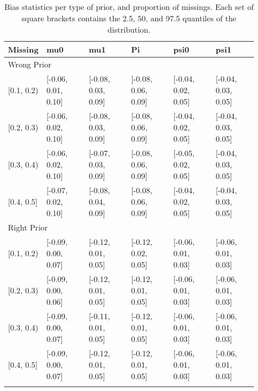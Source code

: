 \begin{table}[ht]
\centering
\begin{tabular}{llllll}
  \toprule
Missing & mu0 & mu1 & Pi & psi0 & psi1 \\ 
  \midrule
\multicolumn{6}{l}{Wrong Prior}\\
{[0.1, 0.2)} & {[-0.06, 0.01, 0.10]} & {[-0.08, 0.03, 0.09]} & {[-0.08, 0.06, 0.09]} & {[-0.04, 0.02, 0.05]} & {[-0.04, 0.03, 0.05]} \\ 
  {[0.2, 0.3)} & {[-0.06, 0.02, 0.10]} & {[-0.08, 0.03, 0.09]} & {[-0.08, 0.06, 0.09]} & {[-0.04, 0.02, 0.05]} & {[-0.04, 0.03, 0.05]} \\ 
  {[0.3, 0.4)} & {[-0.06, 0.02, 0.10]} & {[-0.07, 0.03, 0.09]} & {[-0.08, 0.06, 0.09]} & {[-0.05, 0.02, 0.05]} & {[-0.04, 0.03, 0.05]} \\ 
  {[0.4, 0.5]} & {[-0.07, 0.02, 0.10]} & {[-0.08, 0.04, 0.09]} & {[-0.08, 0.06, 0.09]} & {[-0.04, 0.02, 0.05]} & {[-0.04, 0.03, 0.05]} \\ 
   \midrule
\multicolumn{6}{l}{Right Prior}\\
{[0.1, 0.2)} & {[-0.09, 0.00, 0.07]} & {[-0.12, 0.01, 0.05]} & {[-0.12, 0.02, 0.05]} & {[-0.06, 0.01, 0.03]} & {[-0.06, 0.01, 0.03]} \\ 
  {[0.2, 0.3)} & {[-0.09, 0.00, 0.06]} & {[-0.12, 0.01, 0.05]} & {[-0.12, 0.01, 0.05]} & {[-0.06, 0.01, 0.03]} & {[-0.06, 0.01, 0.03]} \\ 
  {[0.3, 0.4)} & {[-0.09, 0.00, 0.07]} & {[-0.11, 0.01, 0.05]} & {[-0.12, 0.01, 0.05]} & {[-0.06, 0.01, 0.03]} & {[-0.06, 0.01, 0.03]} \\ 
  {[0.4, 0.5]} & {[-0.09, 0.00, 0.07]} & {[-0.12, 0.01, 0.05]} & {[-0.12, 0.01, 0.05]} & {[-0.06, 0.01, 0.03]} & {[-0.06, 0.01, 0.03]} \\ 
   \bottomrule
\multicolumn{6}{l}{}\\
\end{tabular}
\caption{Bias statistics per type of prior, and proportion of missings. Each set of square brackets contains the 2.5, 50, and 97.5 quantiles of the distribution.} 
\label{tab:bias-prior-missigness}
\end{table}
